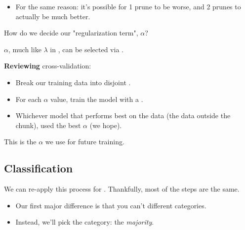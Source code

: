         \begin{itemize}
            \item For the same reason: it's possible for 1 prune to be worse, and 2 prunes to actually be much better.
        \end{itemize}

        How do we decide our "regularization term", $\alpha$?\\

        \begin{concept}
            $\alpha$, much like $\lambda$ in , can be selected via .

            \subsecdiv

            \textbf{Reviewing} cross-validation:

            \begin{itemize}
                \item Break our training data into disjoint .
                \item For each $\alpha$ value, train the model with a .
                \item Whichever model that performs best on the  data (the data outside the chunk), used the best $\alpha$ (we hope).
            \end{itemize}

            This is the $\alpha$ we use for future training.
        \end{concept}

    

        

    \subsection{Classification}

        We can re-apply this process for . Thankfully, most of the steps are the same.

        \begin{itemize}
            \item Our first major difference is that you can't  different categories.
            \item Instead, we'll pick the  category: the \textit{majority}.\\
        \end{itemize}

